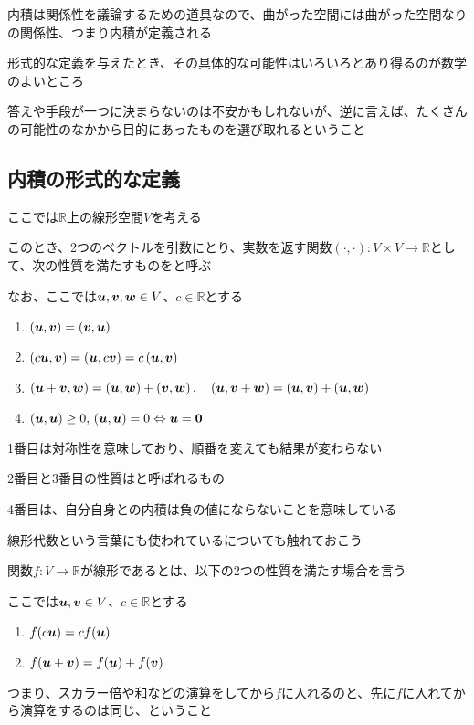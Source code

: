 \documentclass[../book_half_step_linear]{subfiles}
\begin{document}
内積は関係性を議論するための道具なので、曲がった空間には曲がった空間なりの関係性、つまり内積が定義される

\br

形式的な定義を与えたとき、その具体的な可能性はいろいろとあり得るのが数学のよいところ

答えや手段が一つに決まらないのは不安かもしれないが、逆に言えば、たくさんの可能性のなかから目的にあったものを選び取れるということ

\sectionline
\subsection{内積の形式的な定義}

ここでは$\mathbb{R}$上の線形空間$V$を考える

このとき、2つのベクトルを引数にとり、実数を返す関数$(\cdot, \cdot) : V \times V \to \mathbb{R}$として、次の性質を満たすものをと呼ぶ

なお、ここでは$\vb*{u}, \vb*{v}, \vb*{w} \in V$、$c \in \mathbb{R}$とする
\begin{enumerate}
  \item $\left( \vb*{u}, \vb*{v} \right) = \left( \vb*{v}, \vb*{u} \right)$
  \item $\left( c\vb*{u}, \vb*{v} \right) = \left( \vb*{u}, c\vb*{v} \right) = c\left( \vb*{u}, \vb*{v} \right)$
  \item $\left( \vb*{u} + \vb*{v}, \vb*{w} \right) = \left( \vb*{u}, \vb*{w} \right) + \left( \vb*{v}, \vb*{w} \right), \quad \left( \vb*{u}, \vb*{v} + \vb*{w} \right) = \left( \vb*{u}, \vb*{v} \right) + \left( \vb*{u}, \vb*{w} \right)$
  \item $\left( \vb*{u}, \vb*{u} \right) \geq 0, \, \left( \vb*{u}, \vb*{u} \right) = 0 \Leftrightarrow  \vb*{u} = \vb*{0}$
\end{enumerate}
1番目は対称性を意味しており、順番を変えても結果が変わらない

2番目と3番目の性質はと呼ばれるもの

4番目は、自分自身との内積は負の値にならないことを意味している

\sectionline

線形代数という言葉にも使われているについても触れておこう

関数$f : V \to \mathbb{R} $が線形であるとは、以下の2つの性質を満たす場合を言う

ここでは$\vb*{u}, \vb*{v} \in V$、$c \in \mathbb{R}$とする
\begin{enumerate}
  \item $f(c\vb*{u}) = cf(\vb*{u})$
  \item $f(\vb*{u} + \vb*{v}) = f(\vb*{u}) + f(\vb*{v})$
\end{enumerate}
つまり、スカラー倍や和などの演算をしてから$f$に入れるのと、先に$f$に入れてから演算をするのは同じ、ということ
\end{document}
